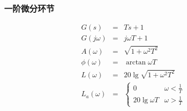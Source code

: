 \documentclass[table]{article}
\begin{document}
\subsubsection{一阶微分环节}
\label{sec:org90892d2}
\begin{eqnarray*}
G(s) & = & Ts+1\\
G(j\omega) & =& j\omega T+1\\
A(\omega) &=& \sqrt{1+\omega^2 T^2}\\
\phi(\omega) &=& \arctan{\omega T} \\
L(\omega)&=& 20\lg\sqrt{1+\omega^2 T^2}\\
L_a(\omega)&=& \begin{cases} 0 & \omega<\frac{1}{T} \\  20\lg\omega T & \omega>\frac{1}{T}\end{cases}
\end{eqnarray*}
\end{document}
